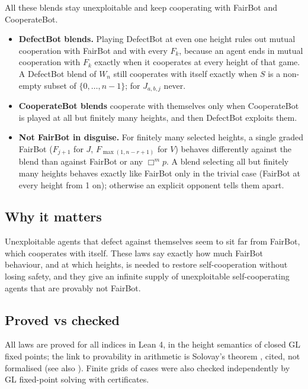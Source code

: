 \documentclass{article}
\begin{document}
  All these blends stay unexploitable and keep cooperating with FairBot and CooperateBot.

\begin{itemize}
\item \textbf{DefectBot blends.} Playing DefectBot at even one height rules out mutual cooperation with FairBot and with every $F_k$, because an agent ends in mutual cooperation with $F_k$ exactly when it cooperates at every height of that game. A DefectBot blend of $W_n$ still cooperates with itself exactly when $S$ is a non-empty subset of $\{0, \dots, n-1\}$; for $J_{a,b,j}$ never.
\item \textbf{CooperateBot blends} cooperate with themselves only when CooperateBot is played at all but finitely many heights, and then DefectBot exploits them.
\item \textbf{Not FairBot in disguise.} For finitely many selected heights, a single graded FairBot ($F_{j+1}$ for $J$, $F_{\max(1,n-r+1)}$ for $V$) behaves differently against the blend than against FairBot or any $\Box^m p$. A blend selecting all but finitely many heights behaves exactly like FairBot only in the trivial case (FairBot at every height from 1 on); otherwise an explicit opponent tells them apart.
\end{itemize}

\subsection*{Why it matters}

Unexploitable agents that defect against themselves seem to sit far from FairBot, which
cooperates with itself. These laws say exactly how much FairBot behaviour, and at which heights,
is needed to restore self-cooperation without losing safety, and they give an infinite supply of
unexploitable self-cooperating agents that are provably not FairBot.

\subsection*{Proved vs checked}

All laws are proved for all indices in Lean 4, in the height semantics of closed GL fixed points;
the link to provability in arithmetic is Solovay's theorem \cite{solovay1976provability}, cited, not
formalised (see also \cite{boolos1993logic}). Finite grids of cases were also checked independently
by GL fixed-point solving with certificates.
\end{document}
